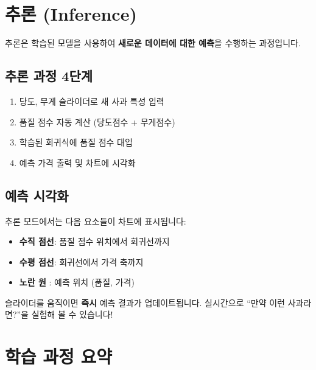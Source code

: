 \documentclass[11pt,a4paper]{article}
\begin{document}
\newpage

\section{추론 (Inference)}

추론은 학습된 모델을 사용하여 \textbf{새로운 데이터에 대한 예측}을 수행하는 과정입니다.

\subsection{추론 과정 4단계}

\begin{enumerate}
  \item {}  당도, 무게 슬라이더로 새 사과 특성 입력
  \item {} 품질 점수 자동 계산 (당도점수 + 무게점수)
  \item {} 학습된 회귀식에 품질 점수 대입
  \item {} 예측 가격 출력 및 차트에 시각화
\end{enumerate}

\subsection{예측 시각화}

추론 모드에서는 다음 요소들이 차트에 표시됩니다:

\begin{itemize}
  \item \textbf{수직 점선}: 품질 점수 위치에서 회귀선까지
  \item \textbf{수평 점선}: 회귀선에서 가격 축까지
  \item \textbf{노란 원} : 예측 위치 (품질, 가격)
\end{itemize}

\begin{tcolorbox}[tipbox, title={\emoji{crystal-ball} 자동 추론 기능}]
슬라이더를 움직이면 \textbf{즉시} 예측 결과가 업데이트됩니다. 실시간으로 ``만약 이런 사과라면?''을 실험해 볼 수 있습니다!
\end{tcolorbox}

\newpage

\section{학습 과정 요약}
\end{document}

